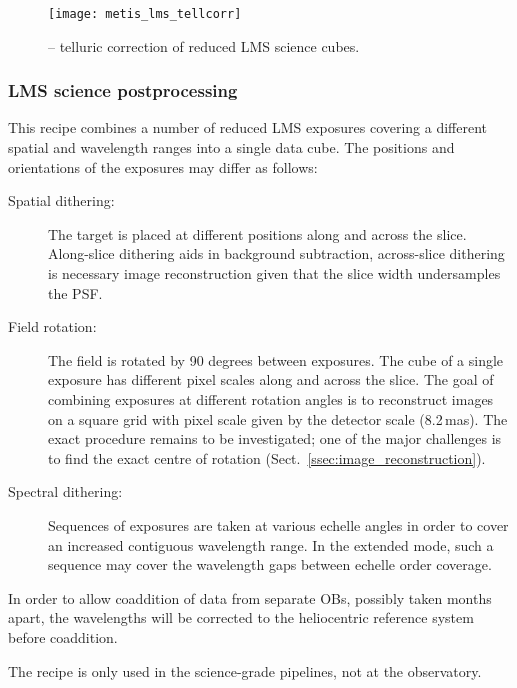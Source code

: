 \begin{figure}[hb]
  \centering
  \texttt{[image: metis\_lms\_tellcorr]}
  \caption[Recipe: ]{
    -- telluric correction of reduced LMS science cubes.}
  \label{fig:metis_lms_tellcorr}
\end{figure}


\clearpage
\subsubsection{LMS science postprocessing}
\label{sssec:lms_sci_postprocess}

This recipe combines a number of reduced LMS exposures covering a
different spatial and wavelength ranges into a single data cube. The
positions and orientations of the exposures may differ as follows:
\begin{description}
\item[Spatial dithering:] The target is placed at different positions
  along and across the slice. Along-slice dithering aids in background
  subtraction, across-slice dithering is necessary image
  reconstruction given that the slice width undersamples the PSF.
\item[Field rotation:] The field is rotated by 90 degrees between
  exposures. The cube of a single exposure has different pixel scales
  along and across the slice. The goal of combining exposures at
  different rotation angles is to reconstruct images on a square grid
  with pixel scale given by the detector scale (8.2\,mas). The exact
  procedure remains to be investigated; one of the major challenges is
  to find the exact centre of rotation
  (Sect.~\ref{ssec:image_reconstruction}).
\item[Spectral dithering:] Sequences of exposures are taken at various
  echelle angles in order to cover an increased contiguous wavelength
  range. In the extended mode, such a sequence may cover the
  wavelength gaps between echelle order coverage.
\end{description}

In order to allow coaddition of data from separate OBs, possibly taken
months apart, the wavelengths will be corrected to the heliocentric
reference system before coaddition.

The recipe is only used in the science-grade pipelines, not at the
observatory.

